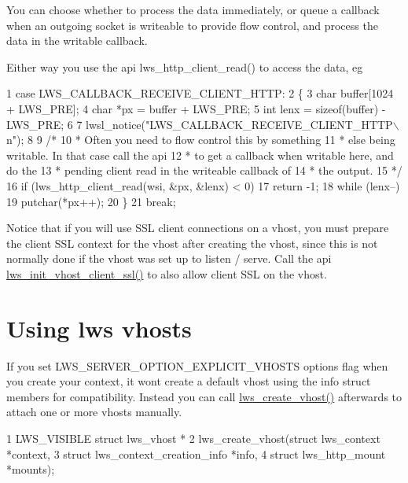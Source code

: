 You can choose whether to process the data immediately, or queue a callback when an outgoing socket is writeable to provide flow control, and process the data in the writable callback.

Either way you use the api {\ttfamily lws\+\_\+http\+\_\+client\+\_\+read()} to access the data, eg


\begin{DoxyCode}
1 case LWS\_CALLBACK\_RECEIVE\_CLIENT\_HTTP:
2         \{
3                 char buffer[1024 + LWS\_PRE];
4                 char *px = buffer + LWS\_PRE;
5                 int lenx = sizeof(buffer) - LWS\_PRE;
6 
7                 lwsl\_notice("LWS\_CALLBACK\_RECEIVE\_CLIENT\_HTTP\(\backslash\)n");
8 
9                 /*
10                  * Often you need to flow control this by something
11                  * else being writable.  In that case call the api
12                  * to get a callback when writable here, and do the
13                  * pending client read in the writeable callback of
14                  * the output.
15                  */
16                 if (lws\_http\_client\_read(wsi, &px, &lenx) < 0)
17                         return -1;
18                 while (lenx--)
19                         putchar(*px++);
20         \}
21         break;
\end{DoxyCode}


Notice that if you will use S\+SL client connections on a vhost, you must prepare the client S\+SL context for the vhost after creating the vhost, since this is not normally done if the vhost was set up to listen / serve. Call the api \hyperlink{group__client_ga4f44b8230e6732816ca5cd8d1aaaf340}{lws\+\_\+init\+\_\+vhost\+\_\+client\+\_\+ssl()} to also allow client S\+SL on the vhost.\hypertarget{md_README.coding_vhosts}{}\section{Using lws vhosts}\label{md_README.coding_vhosts}
If you set L\+W\+S\+\_\+\+S\+E\+R\+V\+E\+R\+\_\+\+O\+P\+T\+I\+O\+N\+\_\+\+E\+X\+P\+L\+I\+C\+I\+T\+\_\+\+V\+H\+O\+S\+TS options flag when you create your context, it won\textquotesingle{}t create a default vhost using the info struct members for compatibility. Instead you can call \hyperlink{group__context-and-vhost_ga0c54c667ccd9b8b3dddcd123ca72f87c}{lws\+\_\+create\+\_\+vhost()} afterwards to attach one or more vhosts manually.


\begin{DoxyCode}
1 LWS\_VISIBLE struct lws\_vhost *
2 lws\_create\_vhost(struct lws\_context *context,
3                  struct lws\_context\_creation\_info *info,
4                  struct lws\_http\_mount *mounts);
\end{DoxyCode}


